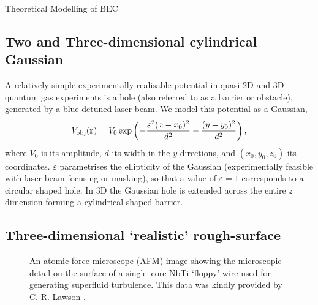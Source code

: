 \begin{chapter}{\label{cha:theoretical_model}Theoretical Modelling of BEC}
\subsection{\label{section:3dcylinderpotential} Two and Three-dimensional cylindrical Gaussian}
A relatively simple experimentally realisable potential in quasi-2D and 3D quantum gas experiments is a hole (also referred to as a barrier or obstacle), generated by a blue-detuned laser beam. We model this potential as a Gaussian,
\begin{equation}
V_{\mathrm{obj}}({\bf r})=V_0 \exp \left( -\frac{\varepsilon^2(x-x_0)^2}{d^2} -\frac{(y-y_0)^2}{d^2}\right),
\end{equation}
where  $V_0$ is its amplitude, $d$ its width in the $y$ directions, and $(x_0,y_0,z_0)$ its coordinates. $\varepsilon$ parametrises the ellipticity of the Gaussian (experimentally feasible with laser beam focusing or masking), so that a value of $\varepsilon=1$ corresponds to a circular shaped hole. In 3D the Gaussian hole is extended across the entire $z$ dimension forming a cylindrical shaped barrier.
\subsection{\label{section:3dafmpotential} Three-dimensional `realistic' rough-surface}
\begin{figure}
	\centering
  \caption{An atomic force microscope (AFM) image showing the microscopic detail on the surface of a  single--core NbTi `floppy' wire used for generating superfluid turbulence. This data was kindly provided by C. R. Lawson \cite{Lawson}.}\label{fig_afmprofile}
 \end{figure}


\end{chapter}
